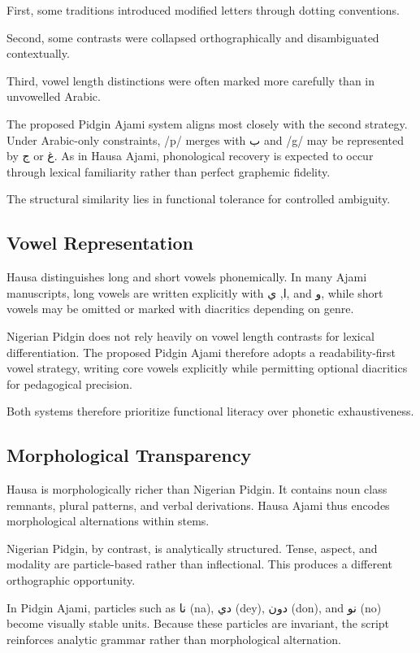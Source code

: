 \documentclass[12pt]{article}
\begin{document}
First, some traditions introduced modified letters through dotting conventions.

Second, some contrasts were collapsed orthographically and disambiguated contextually.

Third, vowel length distinctions were often marked more carefully than in unvowelled Arabic.

The proposed Pidgin Ajami system aligns most closely with the second strategy. Under Arabic-only constraints, /p/ merges with ب and /g/ may be represented by ج or غ. As in Hausa Ajami, phonological recovery is expected to occur through lexical familiarity rather than perfect graphemic fidelity.

The structural similarity lies in functional tolerance for controlled ambiguity.

\subsection{Vowel Representation}

Hausa distinguishes long and short vowels phonemically. In many Ajami manuscripts, long vowels are written explicitly with ا, ي, and و, while short vowels may be omitted or marked with diacritics depending on genre.

Nigerian Pidgin does not rely heavily on vowel length contrasts for lexical differentiation. The proposed Pidgin Ajami therefore adopts a readability-first vowel strategy, writing core vowels explicitly while permitting optional diacritics for pedagogical precision.

Both systems therefore prioritize functional literacy over phonetic exhaustiveness.

\subsection{Morphological Transparency}

Hausa is morphologically richer than Nigerian Pidgin. It contains noun class remnants, plural patterns, and verbal derivations. Hausa Ajami thus encodes morphological alternations within stems.

Nigerian Pidgin, by contrast, is analytically structured. Tense, aspect, and modality are particle-based rather than inflectional. This produces a different orthographic opportunity.

In Pidgin Ajami, particles such as نا (na), دي (dey), دون (don), and نو (no) become visually stable units. Because these particles are invariant, the script reinforces analytic grammar rather than morphological alternation.
\end{document}
